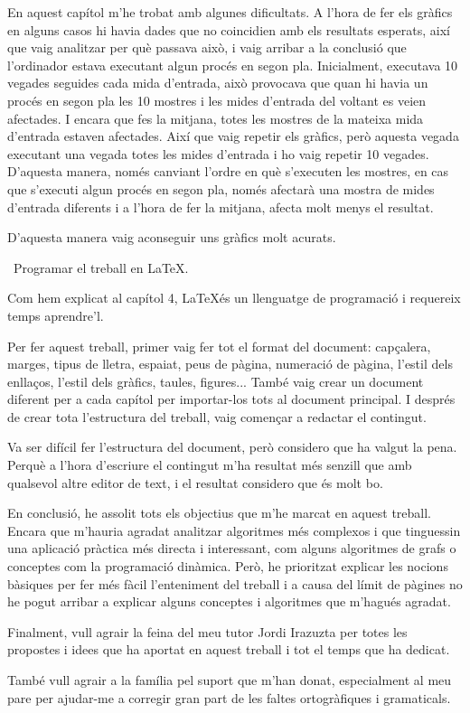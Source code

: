 En aquest capítol m'he trobat amb algunes dificultats. A l'hora de fer els gràfics en alguns casos hi havia dades que no coincidien amb els resultats esperats, així que vaig analitzar per què passava això, i vaig arribar a la conclusió que l'ordinador estava executant algun procés en segon pla. Inicialment, executava 10 vegades seguides cada mida d'entrada, això provocava que quan hi havia un procés en segon pla les 10 mostres i les mides d'entrada del voltant es veien afectades. I encara que fes la mitjana, totes les mostres de la mateixa mida d'entrada estaven afectades. Així que vaig repetir els gràfics, però aquesta vegada executant una vegada totes les mides d'entrada i ho vaig repetir 10 vegades. D'aquesta manera, només canviant l'ordre en què s'executen les mostres, en cas que s'executi algun procés en segon pla, només afectarà una mostra de mides d'entrada diferents i a l'hora de fer la mitjana, afecta molt menys el resultat.

D'aquesta manera vaig aconseguir uns gràfics molt acurats.

\newpage
\quad \textbullet\ Programar el treball en \LaTeX. 

Com hem explicat al capítol 4, \LaTeX \space és un llenguatge de programació i requereix temps aprendre'l.

Per fer aquest treball, primer vaig fer tot el format del document: capçalera, marges, tipus de lletra, espaiat, peus de pàgina, numeració de pàgina, l'estil dels enllaços, l'estil dels gràfics, taules, figures... També vaig crear un document diferent per a cada capítol per importar-los tots al document principal. I després de crear tota l'estructura del treball, vaig començar a redactar el contingut.

Va ser difícil fer l'estructura del document, però considero que ha valgut la pena. Perquè a l'hora d'escriure el contingut m'ha resultat més senzill que amb qualsevol altre editor de text, i el resultat considero que és molt bo.

En conclusió, he assolit tots els objectius que m'he marcat en aquest treball. Encara que m'hauria agradat analitzar algoritmes més complexos i que tinguessin una aplicació pràctica més directa i interessant, com alguns algoritmes de grafs o conceptes com la programació dinàmica. Però, he prioritzat explicar les nocions bàsiques per fer més fàcil l'enteniment del treball i a causa del límit de pàgines no he pogut arribar a explicar alguns conceptes i algoritmes que m'hagués agradat.

Finalment, vull agrair la feina del meu tutor Jordi Irazuzta per totes les propostes i idees que ha aportat en aquest treball i tot el temps que ha dedicat.

També vull agrair a la família pel suport que m'han donat, especialment al meu pare per ajudar-me a corregir gran part de les faltes ortogràfiques i gramaticals. 
